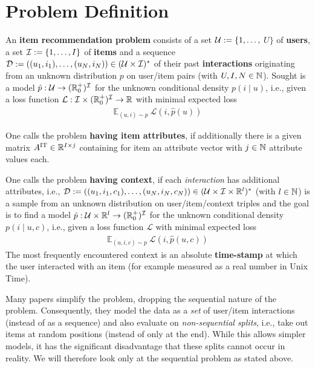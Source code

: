 \documentclass[sigconf,natbib=true]{acmart}
\begin{document}
\section{Problem Definition}
An \textbf{item recommendation problem} consists of
a set ${\cal U}:=\{1,\ldots,$ $U\}$ of \textbf{users}, 
a set ${\cal I}:= \{1,\ldots,I\}$ of \textbf{items} and 
a sequence ${\cal D}:= ((u_1,i_1),\ldots,(u_N,i_N))\in({\cal U}\times{\cal I})^*$
of their past \textbf{interactions} originating from an unknown distribution $p$
on user/item pairs (with $U,I,N\in{\mathbb N}$).
Sought is a model $\hat p: {\cal U}\rightarrow(\R^+_0)^{\cal I}$
for the unknown conditional density $p(i\mid u)$, i.e., given
a loss function $\mathcal{L}:{\cal I}\times (\R^+_0)^{\cal I}\rightarrow\R$
with minimal expected loss
\begin{align*}
    {\mathbb E}_{(u,i)\sim p}\ \mathcal{L}(i, \hat p(u))
\end{align*}

One calls the problem \textbf{having item attributes}, if
additionally there is a given matrix $A^{\text{IT}}\in{\mathbb R}^{I\times j}$ containing for item an attribute vector with $j\in{\mathbb N}$ attribute values each.



One calls the problem \textbf{having context}, if each \textsl{interaction} has additional
attributes, i.e., 
  ${\cal D}:= ((u_1,i_1,c_1),\ldots,(u_N,i_N,c_N))\in({\cal U}\times{\cal I}\times\R^{l})^*$
(with $l\in{\mathbb N}$)
is a sample from an unknown distribution on user/item/context triples
and the goal is to find
a model $\hat p: {\cal U}\times\R^{l}\rightarrow(\R^+_0)^{\cal I}$
for the unknown conditional density $p(i\mid u,c)$, i.e., given
a loss function $\mathcal{L}$ with minimal expected loss
\begin{align*}
    {\mathbb E}_{(u,i,c)\sim p}\ \mathcal{L}(i, \hat p(u,c))
\end{align*}
The most frequently encountered context is an absolute \textbf{time-stamp} at which
the user interacted with an item (for example measured as a real number in Unix Time).

Many papers simplify the problem, dropping the sequential nature of the problem.
Consequently, they model the data as a \textsl{set} of user/item interactions
(instead of as a sequence) and also evaluate on \textsl{non-sequential splits}, i.e., take out items
at random positions (instead of only at the end). While this allows simpler models,
it has the significant disadvantage that these splits cannot occur in reality. We will therefore
look only at the sequential problem as stated above.
\end{document}
